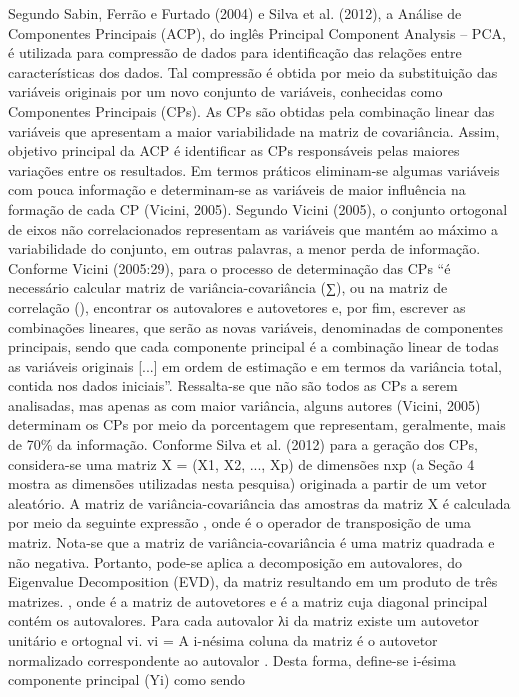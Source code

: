 Segundo Sabin, Ferrão e Furtado (2004) e Silva et al. (2012), a Análise de Componentes Principais (ACP), do inglês Principal Component Analysis – PCA, é utilizada para compressão de dados para identificação das relações entre características dos dados. Tal compressão é obtida por meio da substituição das variáveis originais por um novo conjunto de variáveis, conhecidas como Componentes Principais (CPs). As CPs são obtidas pela combinação linear das variáveis que apresentam a maior variabilidade na matriz de covariância. Assim, objetivo principal da ACP é identificar as CPs responsáveis pelas maiores variações entre os resultados. Em termos práticos eliminam-se algumas variáveis com pouca informação e determinam-se as variáveis de maior influência na formação de cada CP (Vicini, 2005).
Segundo Vicini (2005), o conjunto ortogonal de eixos não correlacionados representam as variáveis que mantém ao máximo a variabilidade do conjunto, em outras palavras, a menor perda de informação. 
Conforme Vicini (2005:29), para o processo de determinação das CPs 
“é necessário calcular matriz de variância-covariância (∑), ou na matriz de correlação (), encontrar os autovalores e autovetores e, por fim, escrever as combinações lineares, que serão as novas variáveis, denominadas de componentes principais, sendo que cada componente principal é a combinação linear de todas as variáveis originais [...] em ordem de estimação e em termos da variância total, contida nos dados iniciais”. 
Ressalta-se que não são todos as CPs a serem analisadas, mas apenas as com maior variância, alguns autores (Vicini, 2005) determinam os CPs por meio da porcentagem que representam, geralmente, mais de 70\% da informação. 
Conforme Silva et al. (2012) para a geração dos CPs, considera-se uma matriz X = (X1, X2, ..., Xp) de dimensões nxp (a Seção 4 mostra as dimensões utilizadas nesta pesquisa) originada a partir de um vetor aleatório. A matriz de variância-covariância  das amostras da matriz X é calculada por meio da seguinte expressão , onde é o operador de transposição de uma matriz. Nota-se que a matriz de variância-covariância é uma matriz quadrada e não negativa. Portanto, pode-se aplica a decomposição em autovalores, do Eigenvalue Decomposition (EVD), da matriz  resultando em um produto de três matrizes.
,
onde  é a matriz de autovetores e  é a matriz cuja diagonal principal contém os autovalores. Para cada autovalor λi da matriz  existe um autovetor unitário e ortognal vi.
vi = 
A i-nésima coluna da matriz  é o autovetor normalizado  correspondente ao autovalor . Desta forma, define-se i-ésima componente principal (Yi) como sendo
